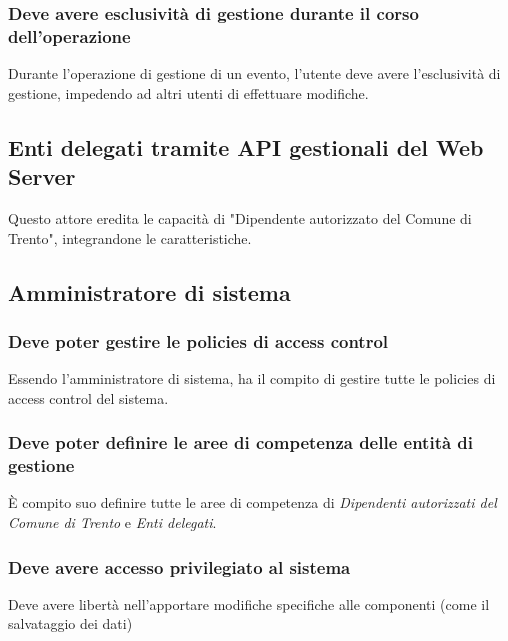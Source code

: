 \documentclass{article}
\begin{document}
\subsubsection{Deve avere esclusività di gestione durante il corso dell'operazione}
\label{5.3.10}
Durante l'operazione di gestione di un evento, l'utente deve avere l'esclusività di gestione, impedendo ad altri utenti di effettuare modifiche.

\subsection{Enti delegati tramite API gestionali del Web Server}
Questo attore eredita le capacità di "Dipendente autorizzato del Comune di Trento", integrandone le caratteristiche.

\subsection{Amministratore di sistema}
\label{5.4.1}

\subsubsection{Deve poter gestire le policies di access control}
\label{5.5.1}
Essendo l'amministratore di sistema, ha il compito di gestire tutte le policies di access control del sistema.

\subsubsection{Deve poter definire le aree di competenza delle entità di gestione}
\label{5.5.2}
È compito suo definire tutte le aree di competenza di \textit{Dipendenti autorizzati del Comune di Trento} e \textit{Enti delegati}.

\subsubsection{Deve avere accesso privilegiato al sistema}
\label{5.5.3}
Deve avere libertà nell'apportare modifiche specifiche alle componenti (come il salvataggio dei dati)
\end{document}
